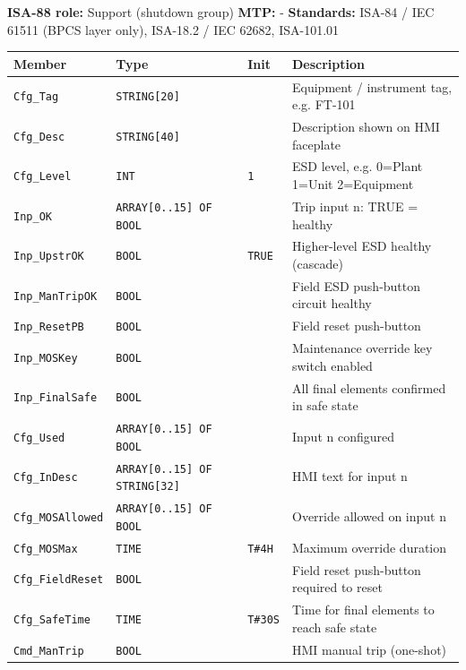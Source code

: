 {\small\textbf{ISA-88 role:} Support (shutdown group) \quad \textbf{MTP:} - \quad \textbf{Standards:} ISA-84 /\allowbreak{} IEC 61511 (BPCS layer only), ISA-18.2 /\allowbreak{} IEC 62682, ISA-101.01}
{\footnotesize
\begin{longtable}{@{}>{\raggedright\arraybackslash}p{3.4cm}>{\raggedright\arraybackslash}p{3.3cm}>{\raggedright\arraybackslash}p{1.3cm}>{\raggedright\arraybackslash}p{6.4cm}@{}}
\toprule
\rowcolor{tblhead}\textbf{Member} & \textbf{Type} & \textbf{Init} & \textbf{Description} \\
\midrule
\endhead
\texttt{Cfg\_Tag} & \texttt{STRING[20]} &  & Equipment /\allowbreak{} instrument tag, e.g. FT-101 \\
\texttt{Cfg\_Desc} & \texttt{STRING[40]} &  & Description shown on HMI faceplate \\
\texttt{Cfg\_Level} & \texttt{INT} & \texttt{1} & ESD level, e.g. 0=Plant 1=Unit 2=Equipment \\
\texttt{Inp\_OK} & \texttt{ARRAY[0..15] OF BOOL} &  & Trip input n: TRUE = healthy \\
\texttt{Inp\_UpstrOK} & \texttt{BOOL} & \texttt{TRUE} & Higher-level ESD healthy (cascade) \\
\texttt{Inp\_ManTripOK} & \texttt{BOOL} &  & Field ESD push-button circuit healthy \\
\texttt{Inp\_ResetPB} & \texttt{BOOL} &  & Field reset push-button \\
\texttt{Inp\_MOSKey} & \texttt{BOOL} &  & Maintenance override key switch enabled \\
\texttt{Inp\_FinalSafe} & \texttt{BOOL} &  & All final elements confirmed in safe state \\
\texttt{Cfg\_Used} & \texttt{ARRAY[0..15] OF BOOL} &  & Input n configured \\
\texttt{Cfg\_InDesc} & \texttt{ARRAY[0..15] OF STRING[32]} &  & HMI text for input n \\
\texttt{Cfg\_MOSAllowed} & \texttt{ARRAY[0..15] OF BOOL} &  & Override allowed on input n \\
\texttt{Cfg\_MOSMax} & \texttt{TIME} & \texttt{T\#4H} & Maximum override duration \\
\texttt{Cfg\_FieldReset} & \texttt{BOOL} &  & Field reset push-button required to reset \\
\texttt{Cfg\_SafeTime} & \texttt{TIME} & \texttt{T\#30S} & Time for final elements to reach safe state \\
\texttt{Cmd\_ManTrip} & \texttt{BOOL} &  & HMI manual trip (one-shot) \\

\end{longtable}}
